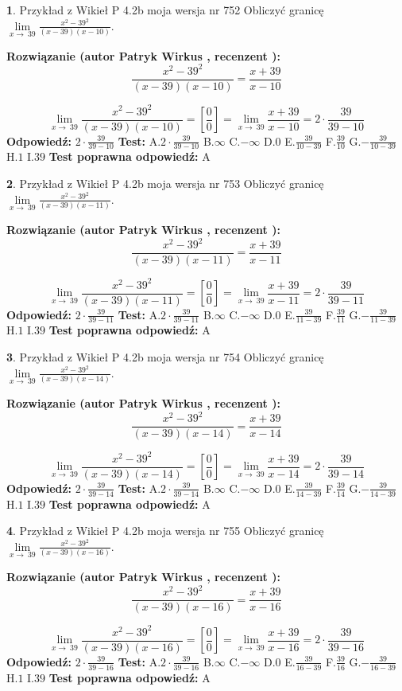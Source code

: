 \documentclass[12pt, a4paper]{article}
\theoremstyle{definition} %
\newtheorem{zad}{}
\newcommand{\zadStart}[1]{\begin{zad}#1\newline}
\newcommand{\zadStop}{\end{zad}}
\newcommand{\rozwStart}[2]{\noindent \textbf{Rozwiązanie (autor #1 , recenzent #2): }\newline}
\newcommand{\rozwStop}{\newline}
\newcommand{\odpStart}{\noindent \textbf{Odpowiedź:}\newline}
\newcommand{\odpStop}{\newline}
\newcommand{\testStart}{\noindent \textbf{Test:}\newline}
\newcommand{\testStop}{\newline}
\newcommand{\kluczStart}{\noindent \textbf{Test poprawna odpowiedź:}\newline}
\newcommand{\kluczStop}{\newline}
\begin{document}
\zadStart{Przykład z Wikieł P 4.2b moja wersja nr 752}
Obliczyć granicę $\lim\limits_{x\to\ 39}\frac{x^{2}-39^{2}}{(x-39)(x-10)}$.
\zadStop
\rozwStart{Patryk Wirkus}{}
$$\frac{x^{2}-39^{2}}{(x-39)(x-10)}=\frac{x+39}{x-10}$$

$$\lim\limits_{x\to\ 39}\frac{x^{2}-39^{2}}{(x-39)(x-10)}=[\frac{0}{0}]=\lim\limits_{x\to\ 39}\frac{x+39}{x-10}=2 \cdot \frac{39}{39-10}$$
\rozwStop
\odpStart
$2 \cdot \frac{39}{39-10}$
\odpStop
\testStart
A.$2 \cdot \frac{39}{39-10}$
B.$\infty$
C.$-\infty$
D.$0$
E.$\frac{39}{10-39}$
F.$\frac{39}{10}$
G.$-\frac{39}{10-39}$
H.$1$
I.$39$
\testStop
\kluczStart
A
\kluczStop



\zadStart{Przykład z Wikieł P 4.2b moja wersja nr 753}
Obliczyć granicę $\lim\limits_{x\to\ 39}\frac{x^{2}-39^{2}}{(x-39)(x-11)}$.
\zadStop
\rozwStart{Patryk Wirkus}{}
$$\frac{x^{2}-39^{2}}{(x-39)(x-11)}=\frac{x+39}{x-11}$$

$$\lim\limits_{x\to\ 39}\frac{x^{2}-39^{2}}{(x-39)(x-11)}=[\frac{0}{0}]=\lim\limits_{x\to\ 39}\frac{x+39}{x-11}=2 \cdot \frac{39}{39-11}$$
\rozwStop
\odpStart
$2 \cdot \frac{39}{39-11}$
\odpStop
\testStart
A.$2 \cdot \frac{39}{39-11}$
B.$\infty$
C.$-\infty$
D.$0$
E.$\frac{39}{11-39}$
F.$\frac{39}{11}$
G.$-\frac{39}{11-39}$
H.$1$
I.$39$
\testStop
\kluczStart
A
\kluczStop



\zadStart{Przykład z Wikieł P 4.2b moja wersja nr 754}
Obliczyć granicę $\lim\limits_{x\to\ 39}\frac{x^{2}-39^{2}}{(x-39)(x-14)}$.
\zadStop
\rozwStart{Patryk Wirkus}{}
$$\frac{x^{2}-39^{2}}{(x-39)(x-14)}=\frac{x+39}{x-14}$$

$$\lim\limits_{x\to\ 39}\frac{x^{2}-39^{2}}{(x-39)(x-14)}=[\frac{0}{0}]=\lim\limits_{x\to\ 39}\frac{x+39}{x-14}=2 \cdot \frac{39}{39-14}$$
\rozwStop
\odpStart
$2 \cdot \frac{39}{39-14}$
\odpStop
\testStart
A.$2 \cdot \frac{39}{39-14}$
B.$\infty$
C.$-\infty$
D.$0$
E.$\frac{39}{14-39}$
F.$\frac{39}{14}$
G.$-\frac{39}{14-39}$
H.$1$
I.$39$
\testStop
\kluczStart
A
\kluczStop



\zadStart{Przykład z Wikieł P 4.2b moja wersja nr 755}
Obliczyć granicę $\lim\limits_{x\to\ 39}\frac{x^{2}-39^{2}}{(x-39)(x-16)}$.
\zadStop
\rozwStart{Patryk Wirkus}{}
$$\frac{x^{2}-39^{2}}{(x-39)(x-16)}=\frac{x+39}{x-16}$$

$$\lim\limits_{x\to\ 39}\frac{x^{2}-39^{2}}{(x-39)(x-16)}=[\frac{0}{0}]=\lim\limits_{x\to\ 39}\frac{x+39}{x-16}=2 \cdot \frac{39}{39-16}$$
\rozwStop
\odpStart
$2 \cdot \frac{39}{39-16}$
\odpStop
\testStart
A.$2 \cdot \frac{39}{39-16}$
B.$\infty$
C.$-\infty$
D.$0$
E.$\frac{39}{16-39}$
F.$\frac{39}{16}$
G.$-\frac{39}{16-39}$
H.$1$
I.$39$
\testStop
\kluczStart
A
\kluczStop
\end{document}
